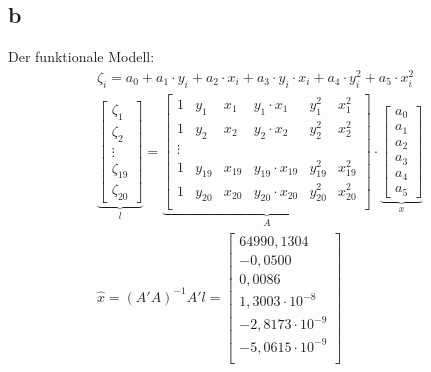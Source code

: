 \subsection{b}
Der funktionale Modell:
\begin{gather*}
	\zeta_i = a_0 + a_1 \cdot y_i + a_2 \cdot x_i + a_3 \cdot y_i \cdot x_i + a_4 \cdot y_i^2 + a_5 \cdot x_i^2 \\
	\underbrace{\begin{bmatrix}
		\zeta_1 \\
		\zeta_2 \\
		\vdots \\
		\zeta_{19} \\
		\zeta_{20}
	\end{bmatrix}}_{\text{$l$}} = \underbrace{\begin{bmatrix}
		1 & y_1 & x_1 & y_1 \cdot x_1 & y_1^2 & x_1^2 \\
		1 & y_2 & x_2 & y_2 \cdot x_2 & y_2^2 & x_2^2 \\
		\vdots \\
		1 & y_{19} & x_{19} & y_{19} \cdot x_{19} & y_{19}^2 & x_{19}^2 \\
		1 & y_{20} & x_{20} & y_{20} \cdot x_{20} & y_{20}^2 & x_{20}^2 \\
	\end{bmatrix}}_{\text{$A$}} \cdot \underbrace{\begin{bmatrix}
		a_0 \\
		a_1 \\
		a_2 \\
		a_3 \\
		a_4 \\
		a_5
	\end{bmatrix}}_{\text{$x$}} \\
	\hat{x} = (A'A)^{-1}A'l = \begin{bmatrix}
		64990,1304 \\
		-0,0500 \\
		0,0086 \\
		1,3003 \cdot 10^{-8} \\
		-2,8173 \cdot 10^{-9} \\
		-5,0615 \cdot 10^{-9} \\
	\end{bmatrix}
\end{gather*}
\newpage
